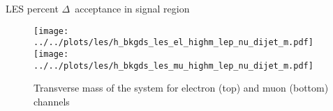 \documentclass{article}
\begin{document}
\begin{table}[htbp]
  \centering
  \caption{LES percent $\Delta$~acceptance in signal region}
\end{table}


\begin{figure}[h]
  \centering
  \texttt{[image: ../../plots/les/h\_bkgds\_les\_el\_highm\_lep\_nu\_dijet\_m.pdf]}
  \texttt{[image: ../../plots/les/h\_bkgds\_les\_mu\_highm\_lep\_nu\_dijet\_m.pdf]}
  
  \caption{Transverse mass of the system for electron (top) and muon (bottom) channels}
\end{figure}
\end{document}
